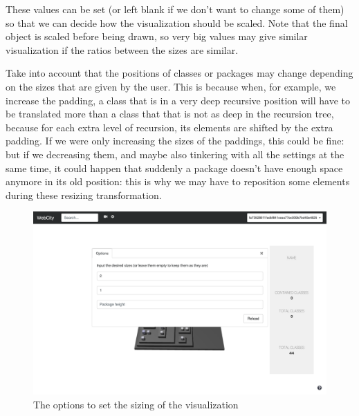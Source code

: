 \documentclass[]{usiinfbachelorproject}
\begin{document}
These values can be set (or left blank if we don't want to change some of them) so that we can decide how the visualization should be scaled. Note that the final object is scaled before being drawn, so very big values may give similar visualization if the ratios between the sizes are similar.

Take into account that the positions of classes or packages may change depending on the sizes that are given by the user. This is because when, for example, we increase the padding, a class that is in a very deep recursive position will have to be translated more than a class that that is not as deep in the recursion tree, because for each extra level of recursion, its elements are shifted by the extra padding. If we were only increasing the sizes of the paddings, this could be fine: but if we decreasing them, and maybe also tinkering with all the settings at the same time, it could happen that suddenly a package doesn't have enough space anymore in its old position: this is why we may have to reposition some elements during these resizing transformation.

\begin{figure} [H]
\centering
\includegraphics[width=1\textwidth]{pictures/sizing_card.png}
\caption{The options to set the sizing of the visualization}
\label{fig:sizing}
\end{figure}
\end{document}
